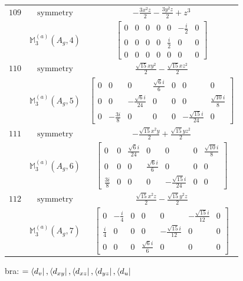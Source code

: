 \documentclass[fleqn,8pt,landscape]{jsarticle}
\begin{document}
\begin{longtable}{ccc}
$ 109 $ & $ \text{symmetry} $ & $ - \frac{3 x^{2} z}{2} - \frac{3 y^{2} z}{2} + z^{3} $ \\
$  $ & $ \mathbb{M}_{3}^{(a)}(A_{g},4) $ & $ \begin{bmatrix} 0 & 0 & 0 & 0 & 0 & - \frac{i}{2} & 0 \\ 0 & 0 & 0 & 0 & \frac{i}{2} & 0 & 0 \\ 0 & 0 & 0 & 0 & 0 & 0 & 0 \end{bmatrix} $ \\ \hline
$ 110 $ & $ \text{symmetry} $ & $ \frac{\sqrt{15} x y^{2}}{2} - \frac{\sqrt{15} x z^{2}}{2} $ \\
$  $ & $ \mathbb{M}_{3}^{(a)}(A_{g},5) $ & $ \begin{bmatrix} 0 & 0 & 0 & \frac{\sqrt{6} i}{6} & 0 & 0 & 0 \\ 0 & 0 & - \frac{\sqrt{6} i}{24} & 0 & 0 & 0 & \frac{\sqrt{10} i}{8} \\ 0 & - \frac{3 i}{8} & 0 & 0 & 0 & - \frac{\sqrt{15} i}{24} & 0 \end{bmatrix} $ \\ \hline
$ 111 $ & $ \text{symmetry} $ & $ - \frac{\sqrt{15} x^{2} y}{2} + \frac{\sqrt{15} y z^{2}}{2} $ \\
$  $ & $ \mathbb{M}_{3}^{(a)}(A_{g},6) $ & $ \begin{bmatrix} 0 & 0 & \frac{\sqrt{6} i}{24} & 0 & 0 & 0 & \frac{\sqrt{10} i}{8} \\ 0 & 0 & 0 & \frac{\sqrt{6} i}{6} & 0 & 0 & 0 \\ \frac{3 i}{8} & 0 & 0 & 0 & - \frac{\sqrt{15} i}{24} & 0 & 0 \end{bmatrix} $ \\ \hline
$ 112 $ & $ \text{symmetry} $ & $ \frac{\sqrt{15} x^{2} z}{2} - \frac{\sqrt{15} y^{2} z}{2} $ \\
$  $ & $ \mathbb{M}_{3}^{(a)}(A_{g},7) $ & $ \begin{bmatrix} 0 & - \frac{i}{4} & 0 & 0 & 0 & - \frac{\sqrt{15} i}{12} & 0 \\ \frac{i}{4} & 0 & 0 & 0 & - \frac{\sqrt{15} i}{12} & 0 & 0 \\ 0 & 0 & 0 & \frac{\sqrt{6} i}{6} & 0 & 0 & 0 \end{bmatrix} $ \\ \hline
\end{longtable}
bra: $=\bra{d_{v}}, \bra{d_{xy}}, \bra{d_{xz}}, \bra{d_{yz}}, \bra{d_{u}}$
\end{document}
